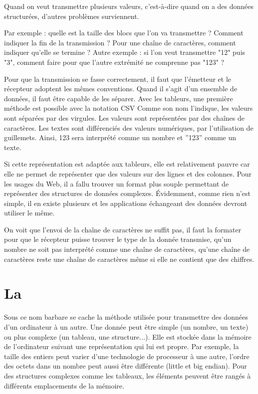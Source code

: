 Quand on veut transmettre plusieurs valeurs, c'est-à-dire quand on a des données structurées, d'autres problèmes surviennent.

Par exemple : quelle est la taille des blocs que l’on va transmettre ? Comment indiquer la fin de la transmission ? Pour une chaîne de caractères, comment indiquer qu’elle se termine ? Autre exemple : si l'on veut transmettre "12" puis "3", comment faire pour que l'autre extrémité ne comprenne pas "123" ?

     \vspace{1em}


Pour que la transmission se fasse correctement, il faut que l’émetteur et le récepteur adoptent les mêmes conventions. Quand il s’agit d’un ensemble de données, il faut être capable de les séparer. Avec les tableurs, une première méthode est possible avec la notation \ac{CSV} Comme son nom l’indique, les valeurs sont séparées par des virgules. Les valeurs sont représentées par des chaînes de caractères. Les textes sont différenciés des valeurs numériques, par l’utilisation de guillemets. Ainsi, 123 sera interprété comme un nombre et ”123” comme un texte.

Si cette représentation est adaptée aux tableurs, elle est relativement pauvre car elle ne permet de représenter que des valeurs sur des lignes et des colonnes. Pour les usages du Web, il a fallu trouver un format plus souple permettant de représenter des structures de données complexes. Évidemment, comme rien n'est simple, il en existe plusieurs et les applications échangeant des données devront utiliser le même.

     \vspace{1em}


On voit que l'envoi de la chaîne de caractères ne suffit pas, il faut la formater pour que le récepteur puisse trouver le type de la donnée transmise, qu'un nombre ne soit pas interprété comme une chaîne de caractères, qu'une chaîne de caractères reste une chaîne de caractères même si elle ne contient que des chiffres.   
    \vspace{1em}
   
\section{La }

Sous ce nom barbare se cache la méthode utilisée pour transmettre 
des données d’un ordinateur à un autre.
Une donnée peut être simple
(un nombre, un texte) ou plus complexe (un tableau, une structure...). 
Elle est stockée dans la mémoire de l'ordinateur suivant une représentation qui lui est propre. Par exemple, la taille des entiers peut varier d'une technologie de processeur à une autre, l'ordre des octets dans un nombre peut aussi être différente (little et big endian). 
Pour des structures complexes comme les tableaux, les éléments peuvent être rangés à différents emplacements de la mémoire. 

